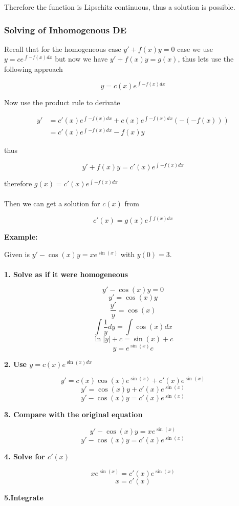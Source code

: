 Therefore the function is Lipschitz continuous, thus a solution is possible.
\QED


\subsubsection{Solving of Inhomogenous DE}

Recall that for the homogeneous case \(y' + f(x)y = 0\) case we use 
\(y = c e^{\int -f(x) dx}\) but now we have \(y' + f(x)y = g(x)\), thus lets use the following
approach

\[y = c(x) e^{\int -f(x) dx}\]

Now use the product rule to derivate

\begin{align*}
y' &= c'(x) e^{\int -f(x) dx} + c(x)e^{\int -f(x) dx}(-(-f(x)))\\
   &= c'(x)e^{\int -f(x) dx} - f(x)y
\end{align*}

thus 

\[y' + f(x)y = c'(x)e^{\int -f(x) dx}\]

therefore \(g(x) = c'(x)e^{\int -f(x) dx}\)
\\\\
Then we can get a solution for \(c(x)\) from

\[
    c'(x) = g(x)e^{\int f(x) dx}
\]

\textbf{Example: }

Given is \(y' -\cos(x)y = x e^{\sin(x)}\) with \(y(0) = 3\).
\\\\
\textbf{1. Solve as if it were homogeneous}

\[y' -\cos(x)y = 0\]
\[y' = \cos(x)y\]
\[\frac{y'}{y} = \cos(x)\]
\[\int\frac{1}{y}dy = \int \cos(x)dx \]
\[ \ln |y|  + c= \sin(x) + c \]
\[ y = e^{\sin(x)}c \]

\textbf{2. Use \(y = c(x)e^{\sin(x)dx}\)}

\[y' = c(x)\cos(x)e^{\sin(x)} + c'(x)e^{\sin(x)}\]
\[y' = \cos(x)y + c'(x)e^{\sin(x)}\]
\[y' - \cos(x)y = c'(x)e^{\sin(x)}\]

\textbf{3. Compare with the original equation}

\[y' -\cos(x)y = x e^{\sin(x)}\]
\[y' - \cos(x)y = c'(x)e^{\sin(x)}\]

\textbf{4. Solve for \(c'(x)\)}

\[xe^{\sin(x)} = c'(x)e^{\sin(x)}\]
\[x = c'(x)\]

\textbf{5.Integrate}

